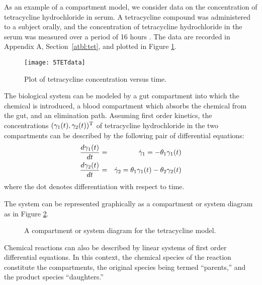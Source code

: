 \begin{example}\label{tet:1}
  
As an example of a compartment model, we consider data on the
concentration of tetracycline hydrochloride in serum.  A
tetracycline compound was administered to a subject orally, and the
concentration of tetracycline hydrochloride in the serum was
measured over a period of 16 hours \cite{wagn:1967}.
The data are recorded in Appendix A, Section~\ref{atbl:tet},
and plotted in Figure \ref{fig:TETdata}.
\begin{figure}[tbp]
  \centerline{\texttt{[image: 5TETdata]}}%
  \caption{\label{fig:TETdata}
  Plot of tetracycline concentration versus time.}
\end{figure}


The biological system can be modeled by a gut compartment into
which the chemical is introduced, a blood compartment which
absorbs the chemical from the gut, and an elimination path.
Assuming first order kinetics, the concentrations
$( \gamma_1 (t) , \gamma_2 (t) ) \trans$
of tetracycline hydrochloride in the two compartments
can be described by the following pair of differential equations:
\begin{eqnarray} \label{eqn:5.1}
  {d \gamma_1 ( t )   \over  d t }&=&
  \dot \gamma_1 = - \theta_1 \gamma_1 ( t )\\
  {d \gamma_2 ( t )   \over  d t }&=&
  \dot \gamma_2 =
  \theta_1 \gamma_1 ( t ) - \theta_2 \gamma_2 ( t )\nonumber
\end{eqnarray}
where the dot denotes differentiation with
respect to time.

The system can be represented graphically as a compartment or system
diagram as in Figure \ref{fig:tet}.

\begin{figure}
  \centerline{\box\graph}
  \caption{\label{fig:tet}
  A compartment or system diagram for the tetracycline model.}
\end{figure}
\end{example}

Chemical reactions can also be described by linear systems of first
order differential equations.
In this context, the chemical species
of the reaction constitute the compartments, the original species
being termed ``parents,''
and the product species ``daughters.''

